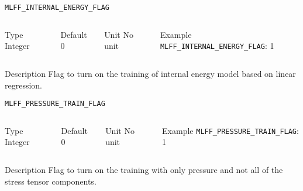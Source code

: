 \begin{frame}[allowframebreaks]{\texttt{{MLFF\_INTERNAL\_ENERGY\_FLAG}}} \label{MLFF_INTERNAL_ENERGY_FLAG}
\vspace*{-12pt}
\begin{columns}
\begin{block}{Type}
Integer
\end{block}

\begin{block}{Default}
0
\end{block}

\begin{block}{Unit}
No unit
\end{block}

\begin{block}{Example}
\texttt{MLFF\_INTERNAL\_ENERGY\_FLAG}: 1
\end{block}
\end{columns}

\begin{block}{Description}
Flag to turn on the training of internal energy model based on linear regression.
\end{block}

\end{frame}

\begin{frame}[allowframebreaks]{\texttt{{MLFF\_PRESSURE\_TRAIN\_FLAG}}} \label{MLFF_PRESSURE_TRAIN_FLAG}
\vspace*{-12pt}
\begin{columns}
\begin{block}{Type}
Integer
\end{block}

\begin{block}{Default}
0
\end{block}

\begin{block}{Unit}
No unit
\end{block}

\begin{block}{Example}
\texttt{MLFF\_PRESSURE\_TRAIN\_FLAG}: 1
\end{block}
\end{columns}

\begin{block}{Description}
Flag to turn on the training with only pressure and not all of the stress tensor components.
\end{block}

\end{frame}

